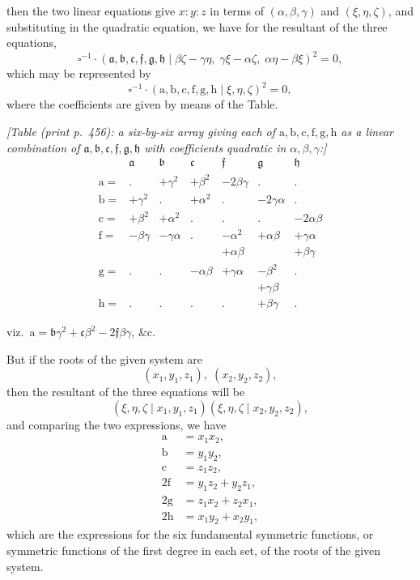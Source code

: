 \documentclass[11pt]{article}
\begin{document}
\medskip

\noindent then the two linear equations give $x : y : z$ in terms of $(\alpha, \beta, \gamma)$ and $(\xi, \eta, \zeta)$, and substituting in the quadratic equation, we have for the resultant of the three equations,
\[
\square^{-1} \cdot (\mathfrak{a}, \mathfrak{b}, \mathfrak{c}, \mathfrak{f}, \mathfrak{g}, \mathfrak{h} \mid \beta\zeta - \gamma\eta,\; \gamma\xi - \alpha\zeta,\; \alpha\eta - \beta\xi)^2 = 0,
\]
which may be represented by
\[
\square^{-1} \cdot (\mathrm{a}, \mathrm{b}, \mathrm{c}, \mathrm{f}, \mathrm{g}, \mathrm{h} \mid \xi, \eta, \zeta)^2 = 0,
\]
where the coefficients are given by means of the Table.

\medskip

\noindent\textit{[Table (print p.~456): a six-by-six array giving each of $\mathrm{a}, \mathrm{b}, \mathrm{c}, \mathrm{f}, \mathrm{g}, \mathrm{h}$ as a linear combination of $\mathfrak{a}, \mathfrak{b}, \mathfrak{c}, \mathfrak{f}, \mathfrak{g}, \mathfrak{h}$ with coefficients quadratic in $\alpha, \beta, \gamma$:]}
\[
\begin{array}{c|cccccc}
 & \mathfrak{a} & \mathfrak{b} & \mathfrak{c} & \mathfrak{f} & \mathfrak{g} & \mathfrak{h} \\
\hline
\mathrm{a} = & . & +\gamma^2 & +\beta^2 & -2\beta\gamma & . & . \\
\mathrm{b} = & +\gamma^2 & . & +\alpha^2 & . & -2\gamma\alpha & . \\
\mathrm{c} = & +\beta^2 & +\alpha^2 & . & . & . & -2\alpha\beta \\
\mathrm{f} = & -\beta\gamma & -\gamma\alpha & . & -\alpha^2 & +\alpha\beta & +\gamma\alpha \\
 &  &  &  & +\alpha\beta &  & +\beta\gamma \\
\mathrm{g} = & . & . & -\alpha\beta & +\gamma\alpha & -\beta^2 & . \\
 &  &  &  &  & + \gamma\beta &  \\
\mathrm{h} = & . & . & . & . & +\beta\gamma & .
\end{array}
\]

\noindent viz.\ $\mathrm{a} = \mathfrak{b}\gamma^2 + \mathfrak{c}\beta^2 - 2\mathfrak{f}\beta\gamma$, \&c.

\medskip

\noindent But if the roots of the given system are
\[
(x_1, y_1, z_1),\; (x_2, y_2, z_2),
\]
then the resultant of the three equations will be
\[
(\xi, \eta, \zeta \mid x_1, y_1, z_1)(\xi, \eta, \zeta \mid x_2, y_2, z_2),
\]
and comparing the two expressions, we have
\[
\begin{aligned}
\mathrm{a} &= x_1 x_2,\\
\mathrm{b} &= y_1 y_2,\\
\mathrm{c} &= z_1 z_2,\\
2\mathrm{f} &= y_1 z_2 + y_2 z_1,\\
2\mathrm{g} &= z_1 x_2 + z_2 x_1,\\
2\mathrm{h} &= x_1 y_2 + x_2 y_1,
\end{aligned}
\]
which are the expressions for the six fundamental symmetric functions, or symmetric functions of the first degree in each set, of the roots of the given system.
\end{document}
